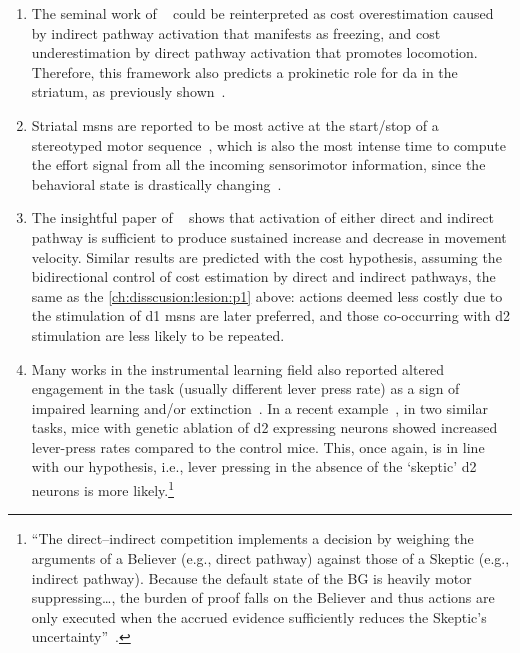 \begin{enumerate}[noitemsep, label=\Roman*.]
    \item \label{ch:disscusion:lesion:p1} The seminal work of \citeauthor{Kravitz2010Nature}~\cite{Kravitz2010Nature} could be reinterpreted as cost overestimation caused by indirect pathway activation that manifests as freezing, and cost underestimation by direct pathway activation that promotes locomotion.
    Therefore, this framework also predicts a prokinetic role for \gls{da} in the striatum, as previously shown~\cite{Howe2016N}.
    \item Striatal \glspl{msn} are reported to be most active at the start/stop of a stereotyped motor sequence~\cite{Barnes2005Nature, Jin2014NN}, which is also the most intense time to compute the effort signal from all the incoming sensorimotor information, since the behavioral state is drastically changing~\cite{Sales-Carbonell2018, Robbe2018}.
    \item The insightful paper of ~\cite{Yttri2016Nature} shows that activation of either direct and indirect pathway is sufficient to produce sustained increase and decrease in movement velocity.
    Similar results are predicted with the cost hypothesis, assuming the bidirectional control of cost estimation by direct and indirect pathways, the same as the \autoref{ch:disscusion:lesion:p1} above:
    actions deemed less costly due to the stimulation of \gls{d1} \glspl{msn} are later preferred, and those co-occurring with \gls{d2} stimulation are less likely to be repeated.
    \item Many works in the instrumental learning field also reported altered engagement in the task (usually different lever press rate) as a sign of impaired learning and/or extinction~\cite[see][as an example]{Hart2018CurrBiol}.
    In a recent example~\cite{Matamales2020Sci}, in two similar tasks, mice with genetic ablation of \gls{d2} expressing neurons showed increased lever-press rates compared to the control mice.
    This, once again, is in line with our hypothesis, i.e., lever pressing in the absence of the `skeptic' \gls{d2} neurons is more likely.\footnote{
        ``The direct–indirect competition implements a decision by weighing the arguments of a Believer (e.g., direct pathway) against those of a Skeptic (e.g., indirect pathway).
        Because the default state of the BG is heavily motor suppressing\ldots, the burden of proof falls on the Believer and thus actions are only executed when the accrued evidence sufficiently reduces the Skeptic’s uncertainty''~\cite{Dunovan2016FrontNeurosci}.
}
\end{enumerate}

